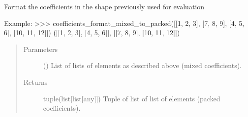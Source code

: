 \documentclass[letterpaper,10pt,english]{sphinxmanual}
\begin{document}
\begin{fulllineitems}
\label{\detokenize{coefficients_shapes:mermin_on_qiskit.coefficients_shapes.coefficients_format_mixed_to_packed}}
Format the coefficients in the shape previously used for evaluation

Example:
\textgreater{}\textgreater{}\textgreater{}  coefficients\_format\_mixed\_to\_packed({[}{[}1, 2, 3{]}, {[}7, 8, 9{]}, {[}4, 5, 6{]}, {[}10, 11, 12{]}{]})                   
({[}{[}1, 2, 3{]}, {[}4, 5, 6{]}{]}, {[}{[}7, 8, 9{]}, {[}10, 11, 12{]}{]})
\begin{quote}\begin{description}
\item[{Parameters}] \leavevmode
{} (\sphinxstyleliteralemphasis{\sphinxupquote{{[}}}\sphinxstyleliteralemphasis{\sphinxupquote{{[}}}\sphinxstyleliteralemphasis{\sphinxupquote{{]}}}\sphinxstyleliteralemphasis{\sphinxupquote{{]}}}) \textendash{} List of lists of elements as 
described above (mixed coefficients).

\item[{Returns}] \leavevmode
tuple(list{[}list{[}any{]}{]}) \textendash{} Tuple of list of list of elements (packed
coefficients).

\end{description}\end{quote}

\end{fulllineitems}

\end{document}
